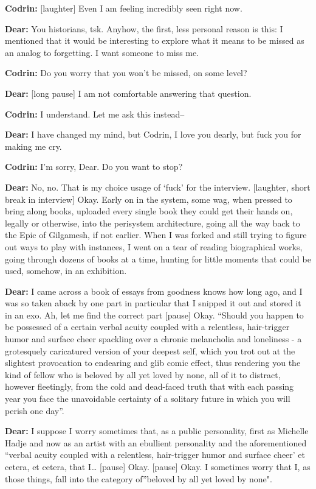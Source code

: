 \textbf{Codrin:} {[}laughter{]} Even I am feeling incredibly seen right now.

\textbf{Dear:} You historians, tsk. Anyhow, the first, less personal reason is this: I mentioned that it would be interesting to explore what it means to be missed as an analog to forgetting. I want someone to miss me.

\textbf{Codrin:} Do you worry that you won't be missed, on some level?

\textbf{Dear:} {[}long pause{]} I am not comfortable answering that question.

\textbf{Codrin:} I understand. Let me ask this instead--

\textbf{Dear:} I have changed my mind, but Codrin, I love you dearly, but fuck you for making me cry.

\textbf{Codrin:} I'm sorry, Dear. Do you want to stop?

\textbf{Dear:} No, no. That is my choice usage of `fuck' for the interview. {[}laughter, short break in interview{]} Okay. Early on in the system, some wag, when pressed to bring along books, uploaded every single book they could get their hands on, legally or otherwise, into the perisystem architecture, going all the way back to the Epic of Gilgamesh, if not earlier. When I was forked and still trying to figure out ways to play with instances, I went on a tear of reading biographical works, going through dozens of books at a time, hunting for little moments that could be used, somehow, in an exhibition.

\textbf{Dear:} I came across a book of essays from goodness knows how long ago, and I was so taken aback by one part in particular that I snipped it out and stored it in an exo. Ah, let me find the correct part {[}pause{]} Okay. ``Should you happen to be possessed of a certain verbal acuity coupled with a relentless, hair-trigger humor and surface cheer spackling over a chronic melancholia and loneliness - a grotesquely caricatured version of your deepest self, which you trot out at the slightest provocation to endearing and glib comic effect, thus rendering you the kind of fellow who is beloved by all yet loved by none, all of it to distract, however fleetingly, from the cold and dead-faced truth that with each passing year you face the unavoidable certainty of a solitary future in which you will perish one day''.

\textbf{Dear:} I suppose I worry sometimes that, as a public personality, first as Michelle Hadje and now as an artist with an ebullient personality and the aforementioned ``verbal acuity coupled with a relentless, hair-trigger humor and surface cheer' et cetera, et cetera, that I\ldots{} {[}pause{]} Okay. {[}pause{]} Okay. I sometimes worry that I, as those things, fall into the category of''beloved by all yet loved by none".

